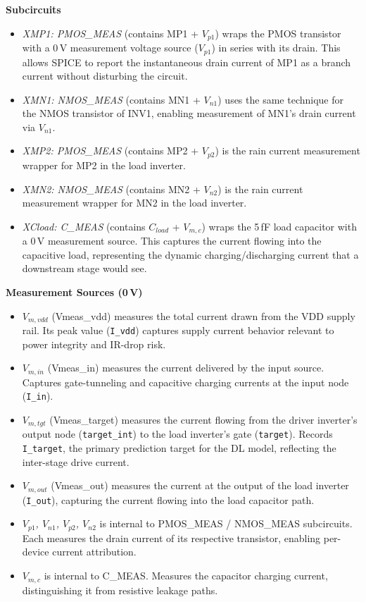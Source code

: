 \documentclass[10pt,twocolumn,letterpaper]{article}
\begin{document}
\noindent \textbf{\normalsize Subcircuits}
\begin{itemize}[nosep]
  \item \textit{XMP1: PMOS\_MEAS} (contains MP1 + $V_{p1}$) wraps the PMOS transistor with a 0\,V measurement voltage source ($V_{p1}$) in series with its drain. This allows SPICE to report the instantaneous drain current of MP1 as a branch current without disturbing the circuit.
  \item \textit{XMN1: NMOS\_MEAS} (contains MN1 + $V_{n1}$) uses the same technique for the NMOS transistor of INV1, enabling measurement of MN1's drain current via $V_{n1}$.
  \item \textit{XMP2: PMOS\_MEAS} (contains MP2 + $V_{p2}$) is the rain current measurement wrapper for MP2 in the load inverter.
  \item \textit{XMN2: NMOS\_MEAS} (contains MN2 + $V_{n2}$) is the rain current measurement wrapper for MN2 in the load inverter.
  \item \textit{XCload: C\_MEAS} (contains $C_{load}$ + $V_{m,c}$) wraps the 5\,fF load capacitor with a 0\,V measurement source. This captures the current flowing into the capacitive load, representing the dynamic charging/discharging current that a downstream stage would see.\\
\end{itemize}

\noindent \textbf{\normalsize Measurement Sources (0\,V)}
\begin{itemize}[nosep]
  \item \textit{$V_{m,vdd}$} (Vmeas\_vdd) measures the total current drawn from the VDD supply rail. Its peak value (\texttt{I\_vdd}) captures supply current behavior relevant to power integrity and IR-drop risk.
  \item \textit{$V_{m,in}$} (Vmeas\_in) measures the current delivered by the input source. Captures gate-tunneling and capacitive charging currents at the input node (\texttt{I\_in}).
  \item \textit{$V_{m,tgt}$} (Vmeas\_target) measures the current flowing from the driver inverter's output node (\texttt{target\_int}) to the load inverter's gate (\texttt{target}). Records \texttt{I\_target}, the primary prediction target for the DL model, reflecting the inter-stage drive current.
  \item \textit{$V_{m,out}$} (Vmeas\_out) measures the current at the output of the load inverter (\texttt{I\_out}), capturing the current flowing into the load capacitor path.
  \item \textit{$V_{p1}$, $V_{n1}$, $V_{p2}$, $V_{n2}$} is internal to PMOS\_MEAS / NMOS\_MEAS subcircuits. Each measures the drain current of its respective transistor, enabling per-device current attribution.
  \item \textit{$V_{m,c}$} is internal to C\_MEAS. Measures the capacitor charging current, distinguishing it from resistive leakage paths.\\
\end{itemize}
\end{document}
